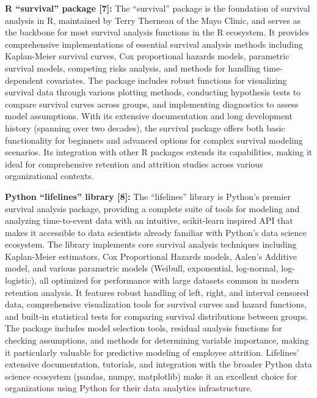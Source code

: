 \documentclass[
  letterpaper,
  DIV=11,
  numbers=noendperiod]{scrartcl}
\begin{document}
\textbf{R ``survival'' package {[}7{]}:} The ``survival'' package is the
foundation of survival analysis in R, maintained by Terry Therneau of
the Mayo Clinic, and serves as the backbone for most survival analysis
functions in the R ecosystem. It provides comprehensive implementations
of essential survival analysis methods including Kaplan-Meier survival
curves, Cox proportional hazards models, parametric survival models,
competing risks analysis, and methods for handling time-dependent
covariates. The package includes robust functions for visualizing
survival data through various plotting methods, conducting hypothesis
tests to compare survival curves across groups, and implementing
diagnostics to assess model assumptions. With its extensive
documentation and long development history (spanning over two decades),
the survival package offers both basic functionality for beginners and
advanced options for complex survival modeling scenarios. Its
integration with other R packages extends its capabilities, making it
ideal for comprehensive retention and attrition studies across various
organizational contexts.

\textbf{Python ``lifelines'' library {[}8{]}:} The ``lifelines'' library
is Python's premier survival analysis package, providing a complete
suite of tools for modeling and analyzing time-to-event data with an
intuitive, scikit-learn inspired API that makes it accessible to data
scientists already familiar with Python's data science ecosystem. The
library implements core survival analysis techniques including
Kaplan-Meier estimators, Cox Proportional Hazards models, Aalen's
Additive model, and various parametric models (Weibull, exponential,
log-normal, log-logistic), all optimized for performance with large
datasets common in modern retention analysis. It features robust
handling of left, right, and interval censored data, comprehensive
visualization tools for survival curves and hazard functions, and
built-in statistical tests for comparing survival distributions between
groups. The package includes model selection tools, residual analysis
functions for checking assumptions, and methods for determining variable
importance, making it particularly valuable for predictive modeling of
employee attrition. Lifelines' extensive documentation, tutorials, and
integration with the broader Python data science ecosystem (pandas,
numpy, matplotlib) make it an excellent choice for organizations using
Python for their data analytics infrastructure.
\end{document}

